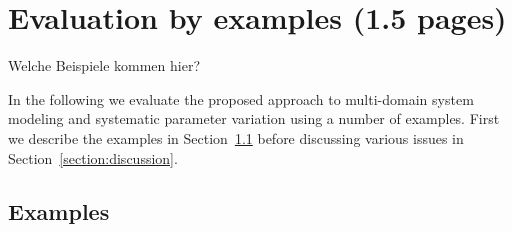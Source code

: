 \section{Evaluation by examples (1.5 pages)}
\label{section:evaluation}

{\color{red} Welche Beispiele kommen hier?}

In the following we evaluate the proposed approach to multi-domain system modeling and systematic parameter variation using a number of examples. First we describe the examples in Section~\ref{section:examples} before discussing various issues in Section~\ref{section:discussion}.

\subsection{Examples}
\label{section:examples}

